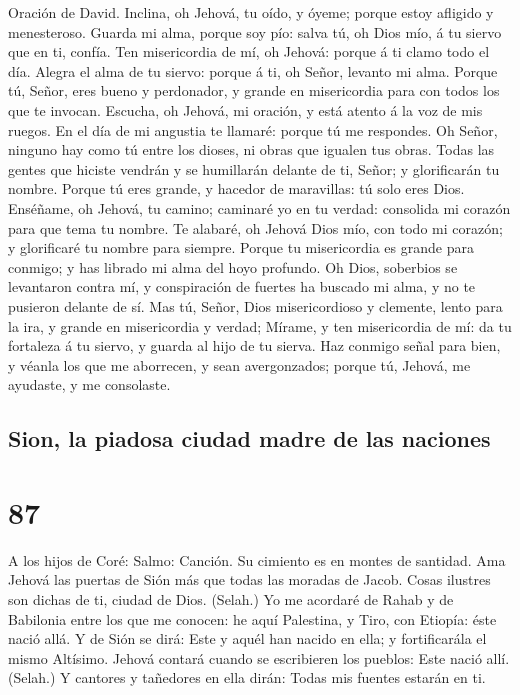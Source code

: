  Oración de David. Inclina, oh Jehová, tu oído, y óyeme;
porque estoy afligido y menesteroso.  Guarda mi alma,
porque soy pío: salva tú, oh Dios mío, á tu siervo que en ti, confía.
 Ten misericordia de mí, oh Jehová: porque á ti clamo todo
el día.  Alegra el alma de tu siervo: porque á ti, oh
Señor, levanto mi alma.  Porque tú, Señor, eres bueno y
perdonador, y grande en misericordia para con todos los que te invocan.
 Escucha, oh Jehová, mi oración, y está atento á la voz de
mis ruegos.  En el día de mi angustia te llamaré: porque
tú me respondes.  Oh Señor, ninguno hay como tú entre los
dioses, ni obras que igualen tus obras.  Todas las gentes
que hiciste vendrán y se humillarán delante de ti, Señor; y glorificarán
tu nombre.  Porque tú eres grande, y hacedor de
maravillas: tú solo eres Dios.  Enséñame, oh Jehová, tu
camino; caminaré yo en tu verdad: consolida mi corazón para que tema tu
nombre.  Te alabaré, oh Jehová Dios mío, con todo mi
corazón; y glorificaré tu nombre para siempre.  Porque tu
misericordia es grande para conmigo; y has librado mi alma del hoyo
profundo.  Oh Dios, soberbios se levantaron contra mí, y
conspiración de fuertes ha buscado mi alma, y no te pusieron delante de
sí.  Mas tú, Señor, Dios misericordioso y clemente, lento
para la ira, y grande en misericordia y verdad;  Mírame,
y ten misericordia de mí: da tu fortaleza á tu siervo, y guarda al hijo
de tu sierva.  Haz conmigo señal para bien, y véanla los
que me aborrecen, y sean avergonzados; porque tú, Jehová, me ayudaste, y
me consolaste.

\hypertarget{sion-la-piadosa-ciudad-madre-de-las-naciones}{%
\subsection{Sion, la piadosa ciudad madre de las
naciones}\label{sion-la-piadosa-ciudad-madre-de-las-naciones}}

\hypertarget{section-86}{%
\section{87}\label{section-86}}

 A los hijos de Coré: Salmo: Canción. Su cimiento es en
montes de santidad.  Ama Jehová las puertas de Sión más
que todas las moradas de Jacob.  Cosas ilustres son dichas
de ti, ciudad de Dios. (Selah.)  Yo me acordaré de Rahab y
de Babilonia entre los que me conocen: he aquí Palestina, y Tiro, con
Etiopía: éste nació allá.  Y de Sión se dirá: Este y aquél
han nacido en ella; y fortificarála el mismo Altísimo. 
Jehová contará cuando se escribieren los pueblos: Este nació allí.
(Selah.)  Y cantores y tañedores en ella dirán: Todas mis
fuentes estarán en ti.

